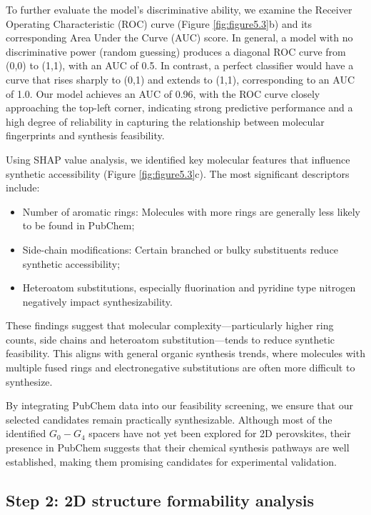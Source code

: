 To further evaluate the model’s discriminative ability, we examine the Receiver Operating Characteristic (ROC) curve (Figure \ref{fig:figure5.3}b) and its corresponding Area Under the Curve (AUC) score. In general, a model with no discriminative power (random guessing) produces a diagonal ROC curve from (0,0) to (1,1), with an AUC of 0.5. In contrast, a perfect classifier would have a curve that rises sharply to (0,1) and extends to (1,1), corresponding to an AUC of 1.0.
Our model achieves an AUC of 0.96, with the ROC curve closely approaching the top-left corner, indicating strong predictive performance and a high degree of reliability in capturing the relationship between molecular fingerprints and synthesis feasibility.



Using SHAP value analysis, we identified key molecular features that influence synthetic accessibility (Figure \ref{fig:figure5.3}c).
The most significant descriptors include:

\begin{itemize}
    \item Number of aromatic rings: Molecules with more rings are generally less likely to be found in PubChem;
    \item Side-chain modifications: Certain branched or bulky substituents reduce synthetic accessibility;
    \item Heteroatom substitutions, especially fluorination and pyridine type nitrogen negatively impact synthesizability.
    
\end{itemize}

These findings suggest that molecular complexity—particularly higher ring counts, side chains and heteroatom substitution—tends to reduce synthetic feasibility. This aligns with general organic synthesis trends, where molecules with multiple fused rings and electronegative substitutions are often more difficult to synthesize.

By integrating PubChem data into our feasibility screening, we ensure that our selected candidates remain practically synthesizable. Although most of the identified $G_0-G_4$ spacers have not yet been explored for 2D perovskites, their presence in PubChem suggests that their chemical synthesis pathways are well established, making them promising candidates for experimental validation.

\subsection{Step 2: 2D structure formability analysis}

